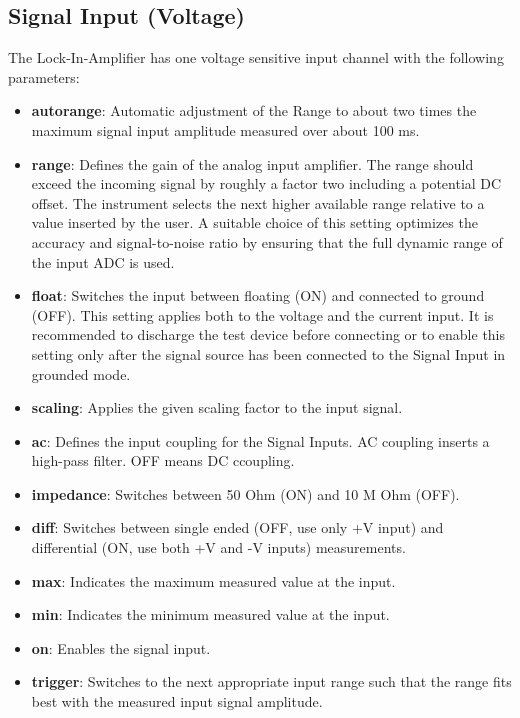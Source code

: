 \documentclass[11pt]{article} %
\begin{document}
\subsection{Signal Input (Voltage)}
The Lock-In-Amplifier has one voltage sensitive input channel with the following parameters:
\begin{itemize}
\item {\bf autorange}: Automatic adjustment of the Range to about two times the maximum signal input amplitude measured over about 100 ms.
\item {\bf range}: Defines the gain of the analog input amplifier. The range should exceed the incoming signal by roughly a factor two including a potential DC offset. The instrument selects the next higher available range relative to a value inserted by the user. A suitable choice of this setting optimizes the accuracy and signal-to-noise ratio by ensuring that the full dynamic range of the input ADC is used.
\item {\bf float}: Switches the input between floating (ON) and connected to ground (OFF). This setting applies both to the voltage and the current input. It is recommended to discharge the test device before connecting or to enable this setting only after the signal source has been connected to the Signal Input in grounded mode.
\item {\bf scaling}: Applies the given scaling factor to the input signal.
\item {\bf ac}: Defines the input coupling for the Signal Inputs. AC coupling inserts a high-pass filter. OFF means DC ccoupling.
\item {\bf impedance}: Switches between 50 Ohm (ON) and 10 M Ohm (OFF).
\item {\bf diff}: Switches between single ended (OFF, use only +V input) and differential (ON, use both +V and -V inputs) measurements.
\item {\bf max}: Indicates the maximum measured value at the input.
\item {\bf min}: Indicates the minimum measured value at the input.
\item {\bf on}: Enables the signal input.
\item {\bf trigger}: Switches to the next appropriate input range such that the range fits best with the measured input signal amplitude.
\end{itemize}
\end{document}
